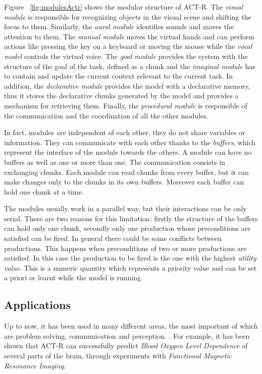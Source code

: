 	Figure ~\ref{fig:modulesActr} shows the modular structure of ACT-R. The \emph{visual module} is responsible for recognizing objects in the visual scene and shifting the focus to them. Similarly, the \emph{aural module} identifies sounds and moves the attention to them. The \emph{manual module} moves the virtual hands and can perform actions like pressing the key on a keyboard or moving the mouse while the \emph{vocal model} controls the virtual voice. The \emph{goal module} provides the system with the structure of the goal of the task, defined as a chunk and the \emph{imaginal module} has to contain and update the current context relevant to the current task. In addition, the \emph{declarative module} provides the model with a declarative memory, thus it stores the declarative chunks generated by the model and provides a mechanism for retrieving them. Finally, the \emph{procedural module} is responsible of the communication and the coordination of all the other modules. 
	
	In fact, modules are independent of each other, they do not share variables or information. They can communicate with each other thanks to the \emph{buffers}, which represent the interface of the module towards the others. A module can have no buffers as well as one or more than one. The communication consists in exchanging chunks. Each module can read chunks from every buffer, but it can make changes only to the chunks in its own buffers. Moreover each buffer can hold one chunk at a time. 

	The modules usually work in a parallel way, but their interactions can be only serial. There are two reasons for this limitation: firstly the structure of the buffers can hold only one chunk, secondly only one production whose preconditions are satisfied can be fired. In general there could be some conflicts between productions. This happens when preconditions of two or more productions are satisfied. In this case the production to be fired is the one with the highest \emph{utility value}. This is a numeric quantity which represents a priority value and can be set a priori or learnt while the model is running. 
	
	\subsection*{Applications}
	Up to now, it has been used in many different areas, the most important of which are problem solving, communication and perception. .
	For example, it has been shown that \mbox{ACT-R} can successfully predict \emph{Blood Oxygen Level Dependence} of several parts of the brain, through experiments with \emph{Functional Magnetic Resonance Imaging}. 
	

